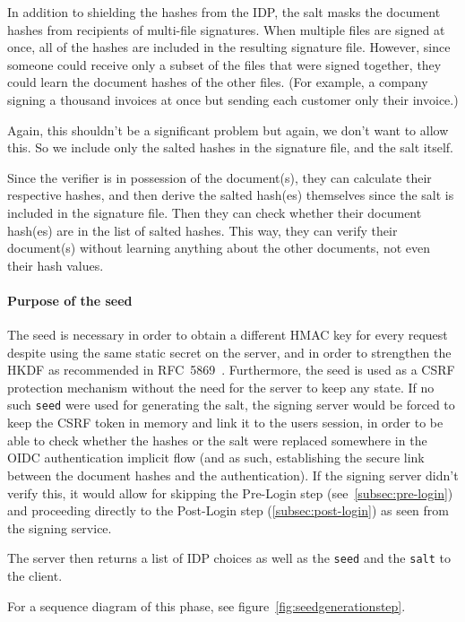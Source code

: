 In addition to shielding the hashes from the \gls{IDP},
the salt masks the document hashes from recipients of multi-file signatures.
When multiple files are signed at once, all of the hashes are included in the resulting signature file.
However, since someone could receive only a subset of the files that were signed together,
they could learn the document hashes of the other files.
(For example, a company signing a thousand invoices at once but sending each customer only their invoice.)

Again, this shouldn't be a significant problem but again, we don't want to allow this.
So we include only the salted hashes in the signature file, and the salt itself.

Since the verifier is in possession of the document(s), they can calculate their respective hashes,
and then derive the salted hash(es) themselves since the salt is included in the signature file.
Then they can check whether their document hash(es) are in the list of salted hashes.
This way, they can verify their document(s) without learning anything about the other documents,
not even their hash values.

\paragraph{Purpose of the seed}
The seed is necessary in order to obtain a different \gls{HMAC} key for every request
despite using the same static secret on the server,
and in order to strengthen the \gls{HKDF} as recommended in RFC~5869~\cite[Section 3.1]{rfc5869}.
Furthermore, the seed is used as a \gls{CSRF} protection mechanism without the need for the server to keep any state.
If no such \texttt{seed} were used for generating the salt,
the signing server would be forced to keep the \gls{CSRF} token in memory and link it to the users session,
in order to be able to check whether the hashes or the salt were replaced somewhere in the \gls{OIDC} authentication implicit flow
(and as such, establishing the secure link between the document hashes and the authentication).
If the signing server didn't verify this,
it would allow for skipping the Pre-Login step (see~\ref{subsec:pre-login})
and proceeding directly to the Post-Login step (\ref{subsec:post-login}) as seen from the signing service.

The server then returns a list of \gls{IDP} choices as well as the \texttt{seed} and the \texttt{salt} to the client.

For a sequence diagram of this phase, see figure~\ref{fig:seedgenerationstep}.

